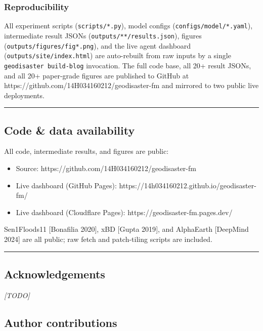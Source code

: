 \subsubsection{Reproducibility}\label{reproducibility}

All experiment scripts (\texttt{scripts/*.py}), model configs (\texttt{configs/model/*.yaml}),
intermediate result JSONs (\texttt{outputs/**/results.json}), figures
(\texttt{outputs/figures/fig*.png}), and the live agent dashboard
(\texttt{outputs/site/index.html}) are auto-rebuilt from raw inputs by a single
\texttt{geodisaster\ build-blog} invocation. The full code base, all 20+ result
JSONs, and all 20+ paper-grade figures are published to GitHub at
https://github.com/14H034160212/geodisaster-fm and mirrored to two public
live deployments.

\begin{center}\rule{0.5\linewidth}{0.5pt}\end{center}

\subsection{Code \& data availability}\label{code-data-availability}

All code, intermediate results, and figures are public:

\begin{itemize}
\tightlist
\item
  Source: https://github.com/14H034160212/geodisaster-fm
\item
  Live dashboard (GitHub Pages): https://14h034160212.github.io/geodisaster-fm/
\item
  Live dashboard (Cloudflare Pages): https://geodisaster-fm.pages.dev/
\end{itemize}

Sen1Floods11 {[}Bonafilia 2020{]}, xBD {[}Gupta 2019{]}, and AlphaEarth {[}DeepMind
2024{]} are all public; raw fetch and patch-tiling scripts are included.

\begin{center}\rule{0.5\linewidth}{0.5pt}\end{center}

\subsection{Acknowledgements}\label{acknowledgements}

\emph{{[}TODO{]}}

\subsection{Author contributions}\label{author-contributions}

